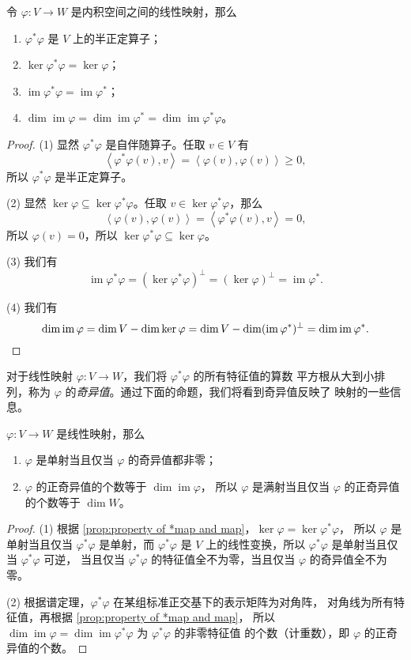 \documentclass[fontset=none,zihao=-4]{Notes}
\DeclareMathOperator\im{im}
\newcommand{\inn}[1]{\left\langle#1\right\rangle}
\begin{document}
\begin{proposition}\label{prop:property of *map and map}
  令 $\varphi:V\to W$ 是内积空间之间的线性映射，那么
  \begin{enumerate}
    \item $\varphi^*\varphi$ 是 $V$ 上的半正定算子；
    \item $\ker\varphi^*\varphi=\ker\varphi$；
    \item $\im\varphi^*\varphi=\im\varphi^*$；
    \item $\dim\im\varphi=\dim\im\varphi^*=\dim\im\varphi^*\varphi$。
  \end{enumerate}
\end{proposition}
\begin{proof}
  (1) 显然 $\varphi^*\varphi$ 是自伴随算子。任取 $v\in V$ 有
  \[
    \inn{\varphi^*\varphi(v),v}=\inn{\varphi(v),\varphi(v)}\geq 0,  
  \]
  所以 $\varphi^*\varphi$ 是半正定算子。

  (2) 显然 $\ker\varphi\subseteq\ker\varphi^*\varphi$。任取
  $v\in\ker \varphi^*\varphi$，那么
  \[
    \inn{\varphi(v),\varphi(v)}=\inn{\varphi^*\varphi(v),v}=0,  
  \]
  所以 $\varphi(v)=0$，所以 $\ker\varphi^*\varphi\subseteq\ker\varphi$。

  (3) 我们有
  \[
    \im\varphi^*\varphi=(\ker\varphi^*\varphi)^\bot=(\ker\varphi)^\bot=\im\varphi^*.  
  \]

  (4) 我们有
  \[
    \dim\im\varphi=\dim V-\dim\ker\varphi=\dim V-\dim(\im\varphi^*)^\bot
    =\dim\im\varphi^*.\qedhere  
  \]
\end{proof}

对于线性映射 $\varphi:V\to W$，我们将 $\varphi^*\varphi$ 的所有特征值的算数
平方根从大到小排列，称为 $\varphi$ 的\emph{奇异值}。通过下面的命题，我们将看到奇异值反映了
映射的一些信息。

\begin{proposition}
  $\varphi:V\to W$ 是线性映射，那么
  \begin{enumerate}
    \item $\varphi$ 是单射当且仅当 $\varphi$ 的奇异值都非零；
    \item $\varphi$ 的正奇异值的个数等于 $\dim\im\varphi$，
    所以 $\varphi$ 是满射当且仅当 $\varphi$ 的正奇异值的个数等于
    $\dim W$。
  \end{enumerate}
\end{proposition}
\begin{proof}
  (1) 根据 \autoref{prop:property of *map and map}，$\ker\varphi=\ker\varphi^*\varphi$，
  所以 $\varphi$ 是单射当且仅当 $\varphi^*\varphi$ 是单射，而 $\varphi^*\varphi$
  是 $V$ 上的线性变换，所以 $\varphi^*\varphi$ 是单射当且仅当 $\varphi^*\varphi$ 可逆，
  当且仅当 $\varphi^*\varphi$ 的特征值全不为零，当且仅当 $\varphi$ 的奇异值全不为零。

  (2) 根据谱定理，$\varphi^*\varphi$ 在某组标准正交基下的表示矩阵为对角阵，
  对角线为所有特征值，再根据 \autoref{prop:property of *map and map}，
  所以 $\dim\im\varphi=\dim\im\varphi^*\varphi$ 为 $\varphi^*\varphi$ 的非零特征值
  的个数（计重数），即 $\varphi$ 的正奇异值的个数。
\end{proof}
\end{document}
